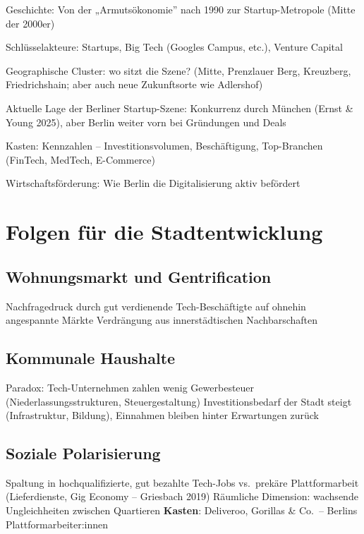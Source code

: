 \documentclass[
]{agujournal2019}
\begin{document}
Geschichte: Von der „Armutsökonomie'' nach 1990 zur Startup-Metropole
(Mitte der 2000er)

Schlüsselakteure: Startups, Big Tech (Googles Campus, etc.), Venture
Capital

Geographische Cluster: wo sitzt die Szene? (Mitte, Prenzlauer Berg,
Kreuzberg, Friedrichshain; aber auch neue Zukunftsorte wie Adlershof)

Aktuelle Lage der Berliner Startup-Szene: Konkurrenz durch München
(Ernst \& Young 2025), aber Berlin weiter vorn bei Gründungen und Deals

Kasten: Kennzahlen -- Investitionsvolumen, Beschäftigung, Top-Branchen
(FinTech, MedTech, E-Commerce)

Wirtschaftsförderung: Wie Berlin die Digitalisierung aktiv befördert

\section{Folgen für die
Stadtentwicklung}\label{folgen-fuxfcr-die-stadtentwicklung}

\subsection{Wohnungsmarkt und
Gentrification}\label{wohnungsmarkt-und-gentrification}

Nachfragedruck durch gut verdienende Tech-Beschäftigte auf ohnehin
angespannte Märkte Verdrängung aus innerstädtischen Nachbarschaften

\subsection{Kommunale Haushalte}\label{kommunale-haushalte}

Paradox: Tech-Unternehmen zahlen wenig Gewerbesteuer
(Niederlassungsstrukturen, Steuergestaltung) Investitionsbedarf der
Stadt steigt (Infrastruktur, Bildung), Einnahmen bleiben hinter
Erwartungen zurück

\subsection{Soziale Polarisierung}\label{soziale-polarisierung}

Spaltung in hochqualifizierte, gut bezahlte Tech-Jobs vs.~prekäre
Plattformarbeit (Lieferdienste, Gig Economy -- Griesbach 2019) Räumliche
Dimension: wachsende Ungleichheiten zwischen Quartieren \textbf{Kasten}:
Deliveroo, Gorillas \& Co.~-- Berlins Plattformarbeiter:innen
\end{document}
